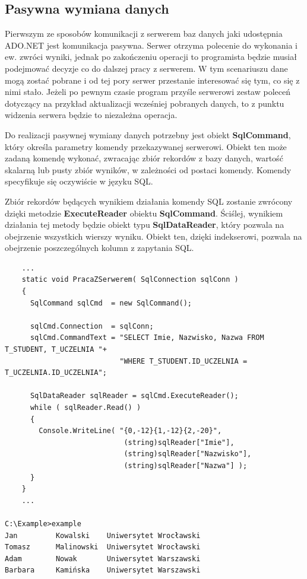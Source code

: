 \subsection{Pasywna wymiana danych}

Pierwszym ze sposobów komunikacji z serwerem baz danych jaki udostępnia ADO.NET jest komunikacja pasywna.
Serwer otrzyma polecenie do wykonania i ew. zwróci wyniki, jednak po zakończeniu operacji to
programista będzie musiał podejmować decyzje co do dalszej pracy z serwerem. W tym scenariuszu dane mogą 
zostać pobrane i od tej pory serwer przestanie interesować się tym, co się z nimi stało. Jeżeli
po pewnym czasie program przyśle serwerowi zestaw poleceń dotyczący na przykład aktualizacji wcześniej
pobranych danych, to z punktu widzenia serwera będzie to niezależna operacja.

Do realizacji pasywnej wymiany danych potrzebny jest obiekt {\bf SqlCommand}, który określa parametry
komendy przekazywanej serwerowi. Obiekt ten może zadaną komendę wykonać, zwracając zbiór rekordów z bazy
danych, wartość skalarną lub pusty zbiór wyników, w zależności od postaci komendy. Komendy
specyfikuje się oczywiście w języku SQL.

Zbiór rekordów będących wynikiem działania komendy SQL zostanie zwrócony dzięki metodzie
{\bf ExecuteReader} obiektu {\bf SqlCommand}. Ściślej, wynikiem działania tej metody będzie
obiekt typu {\bf SqlDataReader}, który pozwala na obejrzenie wszystkich wierszy wyniku. Obiekt ten, dzięki
indekserowi, pozwala na obejrzenie poszczególnych kolumn z zapytania SQL.

\begin{scriptsize}
\begin{verbatim}
    ...
    static void PracaZSerwerem( SqlConnection sqlConn )
    {
      SqlCommand sqlCmd  = new SqlCommand();

      sqlCmd.Connection  = sqlConn;
      sqlCmd.CommandText = "SELECT Imie, Nazwisko, Nazwa FROM T_STUDENT, T_UCZELNIA "+
                           "WHERE T_STUDENT.ID_UCZELNIA = T_UCZELNIA.ID_UCZELNIA";

      SqlDataReader sqlReader = sqlCmd.ExecuteReader();      
      while ( sqlReader.Read() )
      {
        Console.WriteLine( "{0,-12}{1,-12}{2,-20}",
                            (string)sqlReader["Imie"],
                            (string)sqlReader["Nazwisko"],
                            (string)sqlReader["Nazwa"] );                            
      }
    }
    ...

C:\Example>example
Jan         Kowalski    Uniwersytet Wrocławski
Tomasz      Malinowski  Uniwersytet Wrocławski
Adam        Nowak       Uniwersytet Warszawski
Barbara     Kamińska    Uniwersytet Warszawski
\end{verbatim}
\end{scriptsize}

